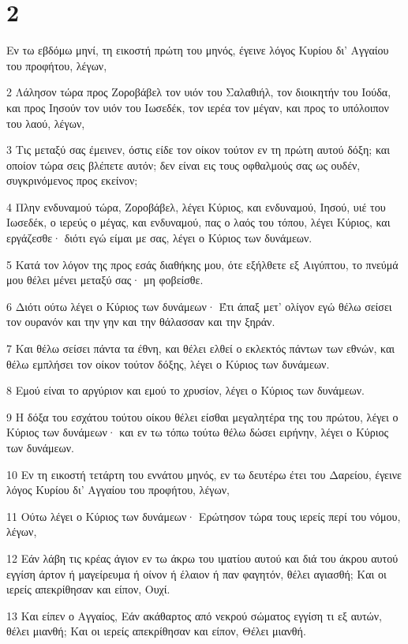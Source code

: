 \chapter{2}

\par Εν τω εβδόμω μηνί, τη εικοστή πρώτη του μηνός, έγεινε λόγος Κυρίου δι' Αγγαίου του προφήτου, λέγων,
\par 2 Λάλησον τώρα προς Ζοροβάβελ τον υιόν του Σαλαθιήλ, τον διοικητήν του Ιούδα, και προς Ιησούν τον υιόν του Ιωσεδέκ, τον ιερέα τον μέγαν, και προς το υπόλοιπον του λαού, λέγων,
\par 3 Τις μεταξύ σας έμεινεν, όστις είδε τον οίκον τούτον εν τη πρώτη αυτού δόξη; και οποίον τώρα σεις βλέπετε αυτόν; δεν είναι εις τους οφθαλμούς σας ως ουδέν, συγκρινόμενος προς εκείνον;
\par 4 Πλην ενδυναμού τώρα, Ζοροβάβελ, λέγει Κύριος, και ενδυναμού, Ιησού, υιέ του Ιωσεδέκ, ο ιερεύς ο μέγας, και ενδυναμού, πας ο λαός του τόπου, λέγει Κύριος, και εργάζεσθε· διότι εγώ είμαι με σας, λέγει ο Κύριος των δυνάμεων.
\par 5 Κατά τον λόγον της προς εσάς διαθήκης μου, ότε εξήλθετε εξ Αιγύπτου, το πνεύμά μου θέλει μένει μεταξύ σας· μη φοβείσθε.
\par 6 Διότι ούτω λέγει ο Κύριος των δυνάμεων· Έτι άπαξ μετ' ολίγον εγώ θέλω σείσει τον ουρανόν και την γην και την θάλασσαν και την ξηράν.
\par 7 Και θέλω σείσει πάντα τα έθνη, και θέλει ελθεί ο εκλεκτός πάντων των εθνών, και θέλω εμπλήσει τον οίκον τούτον δόξης, λέγει ο Κύριος των δυνάμεων.
\par 8 Εμού είναι το αργύριον και εμού το χρυσίον, λέγει ο Κύριος των δυνάμεων.
\par 9 Η δόξα του εσχάτου τούτου οίκου θέλει είσθαι μεγαλητέρα της του πρώτου, λέγει ο Κύριος των δυνάμεων· και εν τω τόπω τούτω θέλω δώσει ειρήνην, λέγει ο Κύριος των δυνάμεων.
\par 10 Εν τη εικοστή τετάρτη του εννάτου μηνός, εν τω δευτέρω έτει του Δαρείου, έγεινε λόγος Κυρίου δι' Αγγαίου του προφήτου, λέγων,
\par 11 Ούτω λέγει ο Κύριος των δυνάμεων· Ερώτησον τώρα τους ιερείς περί του νόμου, λέγων,
\par 12 Εάν λάβη τις κρέας άγιον εν τω άκρω του ιματίου αυτού και διά του άκρου αυτού εγγίση άρτον ή μαγείρευμα ή οίνον ή έλαιον ή παν φαγητόν, θέλει αγιασθή; Και οι ιερείς απεκρίθησαν και είπον, Ουχί.
\par 13 Και είπεν ο Αγγαίος, Εάν ακάθαρτος από νεκρού σώματος εγγίση τι εξ αυτών, θέλει μιανθή; Και οι ιερείς απεκρίθησαν και είπον, Θέλει μιανθή.
